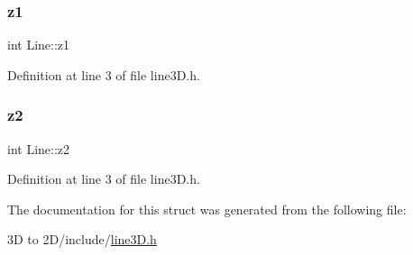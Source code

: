 \subsubsection{\texorpdfstring{z1}{z1}}
{\footnotesize\ttfamily int Line\+::z1}



Definition at line 3 of file line3\+D.\+h.

\mbox{\label{struct_line_a1b6e306dc5d91f6f6046892b0b12350d}} 
\subsubsection{\texorpdfstring{z2}{z2}}
{\footnotesize\ttfamily int Line\+::z2}



Definition at line 3 of file line3\+D.\+h.



The documentation for this struct was generated from the following file\+:\begin{DoxyCompactItemize}
\item 
3\+D to 2\+D/include/\mbox{\hyperlink{line3_d_8h}{line3\+D.\+h}}\end{DoxyCompactItemize}

